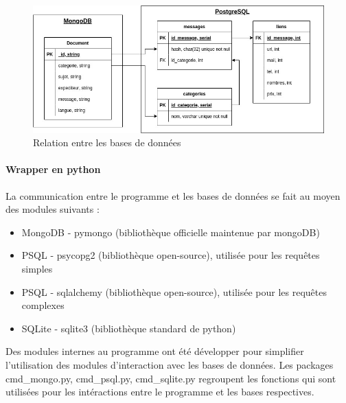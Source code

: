     \begin{figure}[H]
		\includegraphics[width=\linewidth]{img/bddFouille}
		\caption{Relation entre les bases de données}
		\label{fig:BddPhase1}
	\end{figure}

    \paragraph{Wrapper en python}
        La communication entre le programme et les bases de données se fait au moyen des modules suivants :
        \begin{itemize}
            \item MongoDB - pymongo (bibliothèque officielle maintenue par mongoDB)
            \item PSQL - psycopg2 (bibliothèque open-source), utilisée pour les requêtes simples
            \item PSQL - sqlalchemy (bibliothèque open-source), utilisée pour les requêtes complexes
            \item SQLite - sqlite3 (bibliothèque standard de python)
        \end{itemize}

        Des modules internes au programme ont été développer pour simplifier l'utilisation des modules d'interaction avec les bases de données.
        Les packages cmd\_mongo.py, cmd\_psql.py, cmd\_sqlite.py regroupent les fonctions qui sont utilisées pour les intéractions entre le programme et les bases respectives.

